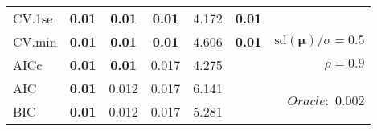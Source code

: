 \begin{table}
\begin{center}
\begin{tabular}{l*{5}{c}|r}
 \hline 
CV.1se & {\bf 0.01} & {\bf 0.01} & {\bf 0.01} & 4.172 & {\bf 0.01} & \\
CV.min & {\bf 0.01} & {\bf 0.01} & {\bf 0.01} & 4.606 & {\bf 0.01} &  $\mathrm{sd}(\mathbf{\mu})/\sigma=0.5$ \\
AICc & {\bf 0.01} & {\bf 0.01} & 0.017 & 4.275 & & $\rho=0.9$ \\
AIC & {\bf 0.01} & 0.012 & 0.017 & 6.141 & &  \multirow{2}{*}{$Oracle: $ 0.002} \\
BIC & {\bf 0.01} & 0.012 & 0.017 & 5.281 & &  \\
 \hline 
\end{tabular}
\end{center}
\vspace{-1cm}
\end{table}




